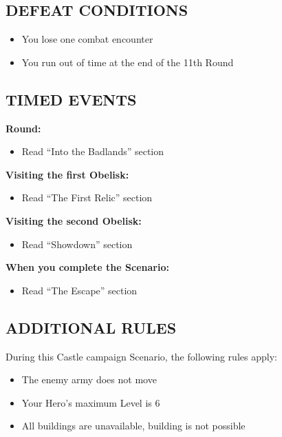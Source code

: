 \begin{multicols*}{2}
\subsection*{\MakeUppercase{Defeat Conditions}}
\begin{itemize}
  \item You lose one combat encounter
  \item You run out of time at the end of the 11th Round
\end{itemize}

\end{multicols*}

\begin{multicols}{2}

\subsection*{\MakeUppercase{Timed Events}}

\textbf{ Round:}
\begin{itemize}
  \item Read ``Into the Badlands'' section
\end{itemize}

\textbf{Visiting the first Obelisk:}
\begin{itemize}
  \item Read ``The First Relic'' section
\end{itemize}

\textbf{Visiting the second Obelisk:}
\begin{itemize}
  \item Read ``Showdown'' section
\end{itemize}

\textbf{When you complete the Scenario:}
\begin{itemize}
  \item Read ``The Escape'' section
\end{itemize}

\subsection*{\MakeUppercase{Additional rules}}

During this Castle campaign Scenario, the following rules apply:

\begin{itemize}
  \item The enemy army does not move
  \item Your Hero's maximum Level is 6
  \item All buildings are unavailable, building is not possible
\end{itemize}


\end{multicols}
